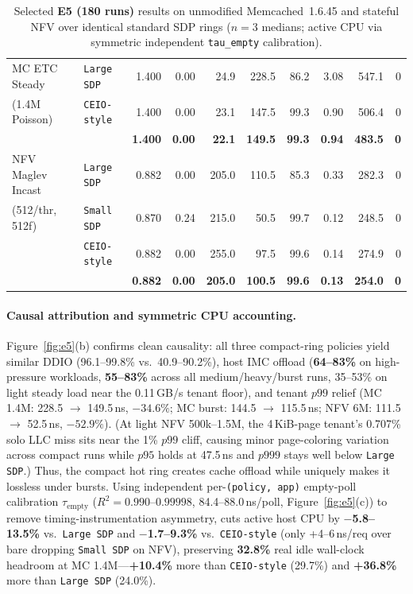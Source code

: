 \begin{table}[t]
\begin{tabular}{l l r r r r r r r r}
\midrule
MC ETC Steady      & \texttt{Large SDP}     & 1.400 & 0.00 & 24.9  & 228.5 & 86.2 & 3.08 & 547.1 & 0 \\
(1.4M Poisson)     & \texttt{CEIO-style}    & 1.400 & 0.00 & 23.1  & 147.5 & 99.3 & 0.90 & 506.4 & 0 \\
                   & \textbf{\sys{}}        & \textbf{1.400} & \textbf{0.00} & \textbf{22.1} & \textbf{149.5} & \textbf{99.3} & \textbf{0.94} & \textbf{483.5} & \textbf{0} \\
\midrule
NFV Maglev Incast  & \texttt{Large SDP}     & 0.882 & 0.00 & 205.0 & 110.5 & 85.3 & 0.33 & 282.3 & 0 \\
(512/thr, 512f)    & \texttt{Small SDP}     & 0.870 & 0.24 & 215.0 & 50.5  & 99.7 & 0.12 & 248.5 & 0 \\
                   & \texttt{CEIO-style}    & 0.882 & 0.00 & 255.0 & 97.5  & 99.6 & 0.14 & 274.9 & 0 \\
                   & \textbf{\sys{}}        & \textbf{0.882} & \textbf{0.00} & \textbf{205.0} & \textbf{100.5} & \textbf{99.6} & \textbf{0.13} & \textbf{254.0} & \textbf{0} \\
\bottomrule
\end{tabular}
\caption{Selected \textbf{E5 (180 runs)} results on unmodified Memcached~1.6.45
and stateful NFV over identical standard SDP rings ($n=3$ medians; active CPU
via symmetric independent \texttt{tau\_empty} calibration).}
\label{tab:e5-summary}
\end{table}

\paragraph{Causal attribution and symmetric CPU accounting.}
Figure~\ref{fig:e5}(b) confirms clean causality: all three compact-ring
policies yield similar DDIO (96.1--99.8\% vs.\ 40.9--90.2\%), host IMC offload
(\textbf{64--83\%} on high-pressure workloads, \textbf{55--83\%} across all
medium/heavy/burst runs, 35--53\% on light steady load near the 0.11\,GB/s
tenant floor), and tenant $p99$ relief (MC 1.4M: 228.5 $\to$ 149.5\,ns, $-34.6\%$;
MC burst: 144.5 $\to$ 115.5\,ns; NFV 6M: 111.5 $\to$ 52.5\,ns, $-52.9\%$).
(At light NFV 500k--1.5M, the 4\,KiB-page tenant's 0.707\% solo LLC miss sits
near the 1\% $p99$ cliff, causing minor page-coloring variation across compact
runs while $p95$ holds at 47.5\,ns and $p999$ stays well below \texttt{Large SDP}.)
Thus, the compact hot ring creates cache offload while \sys{} uniquely makes it
lossless under bursts. Using independent per-\texttt{(policy, app)} empty-poll
calibration $\tau_{\text{empty}}$ ($R^2 = 0.990$--$0.99998$, 84.4--88.0\,ns/poll,
Figure~\ref{fig:e5}(c)) to remove timing-instrumentation asymmetry, \sys{} cuts
active host CPU by \textbf{$-$5.8--13.5\%} vs.\ \texttt{Large SDP} and
\textbf{$-$1.7--9.3\%} vs.\ \texttt{CEIO-style} (only +4--6\,ns/req over bare
dropping \texttt{Small SDP} on NFV), preserving \textbf{32.8\%} real idle
wall-clock headroom at MC 1.4M---\textbf{+10.4\%} more than \texttt{CEIO-style}
(29.7\%) and \textbf{+36.8\%} more than \texttt{Large SDP} (24.0\%).

